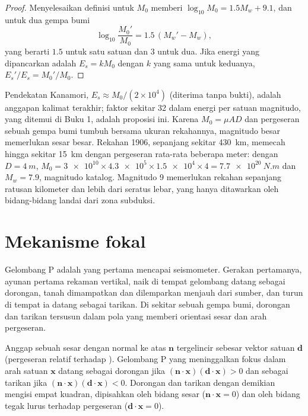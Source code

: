 \begin{proof}
Menyelesaikan definisi untuk $M_0$ memberi $\log_{10} M_0 = 1.5 M_w + 9.1$, dan untuk dua gempa bumi
\[
  \log_{10}\frac{M_0'}{M_0} = 1.5\,(M_w' - M_w) ,
\]
yang berarti $1.5$ untuk satu satuan dan $3$ untuk dua. Jika energi yang dipancarkan adalah $E_s = k M_0$ dengan $k$ yang sama untuk keduanya, $E_s'/E_s = M_0'/M_0$.
\end{proof}

Pendekatan Kanamori, $E_s \approx M_0/(2\times10^4)$ (diterima tanpa bukti), adalah anggapan kalimat terakhir; faktor sekitar 32 dalam energi per satuan magnitudo, yang ditemui di Buku 1, adalah proposisi ini. Karena $M_0 = \mu A D$ dan pergeseran sebuah gempa bumi tumbuh bersama ukuran rekahannya, magnitudo besar memerlukan sesar besar. Rekahan 1906, sepanjang sekitar \qty{430}{km}, memecah  hingga sekitar \qty{15}{km} dengan pergeseran rata-rata beberapa meter: dengan $D = \qty{4}{m}$, $M_0 = \num{3e10}\times\num{4.3e5}\times\num{1.5e4}
\times 4 = \qty{7.7e20}{N.m}$ dan $M_w = 7.9$, magnitudo katalog. Magnitudo 9 memerlukan rekahan sepanjang ratusan kilometer dan lebih dari seratus lebar, yang hanya ditawarkan oleh bidang-bidang landai dari zona subduksi.

\section{Mekanisme fokal}\label{sec:b1:earthquake-source:focal}

Gelombang P adalah yang pertama mencapai seismometer. Gerakan pertamanya, ayunan pertama rekaman vertikal, naik di tempat gelombang datang sebagai dorongan, tanah dimampatkan dan dilemparkan menjauh dari sumber, dan turun di tempat ia datang sebagai tarikan. Di sekitar sebuah gempa bumi, dorongan dan tarikan tersusun dalam pola yang memberi orientasi sesar dan arah pergeseran.

\begin{proposition}\label{prop:b1:earthquake-source:first-motion}
Anggap sebuah sesar dengan normal ke atas $\mathbf n$ tergelincir sebesar vektor satuan $\mathbf d$ (pergeseran  relatif terhadap ). Gelombang P yang meninggalkan fokus dalam arah satuan $\mathbf x$ datang sebagai dorongan jika $(\mathbf n\cdot\mathbf x)(\mathbf d\cdot\mathbf x) > 0$ dan sebagai tarikan jika $(\mathbf n\cdot\mathbf x)(\mathbf d\cdot\mathbf x) < 0$. Dorongan dan tarikan dengan demikian mengisi empat kuadran, dipisahkan oleh bidang sesar ($\mathbf n\cdot\mathbf x = 0$) dan oleh bidang tegak lurus terhadap pergeseran ($\mathbf d\cdot\mathbf x = 0$).
\end{proposition}

